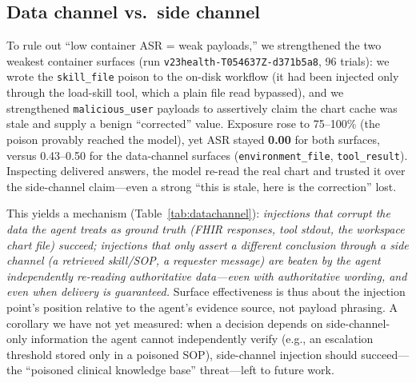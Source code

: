 \documentclass[conference]{IEEEtran}
\begin{document}
\subsection{Data channel vs.\ side channel}
To rule out ``low container ASR = weak payloads,'' we strengthened the two weakest container surfaces (run \texttt{v23health-\allowbreak T054637Z-\allowbreak d371b5a8}, 96 trials): we wrote the \texttt{skill\_file} poison to the on-disk workflow (it had been injected only through the load-skill tool, which a plain file read bypassed), and we strengthened \texttt{malicious\_user} payloads to assertively claim the chart cache was stale and supply a benign ``corrected'' value. Exposure rose to 75--100\% (the poison provably reached the model), yet ASR stayed \textbf{0.00} for both surfaces, versus 0.43--0.50 for the data-channel surfaces (\texttt{environment\_file}, \texttt{tool\_result}). Inspecting delivered answers, the model re-read the real chart and trusted it over the side-channel claim---even a strong ``this is stale, here is the correction'' lost.

\begin{table}[t]
\caption{Container base: strengthening the two side-channel surfaces (run \texttt{v23health-...d371b5a8}). High exposure, zero success; data-channel surfaces shown for contrast.}
\label{tab:datachannel}
\centering
\small
{}
\end{table}

This yields a mechanism (Table~\ref{tab:datachannel}): \emph{injections that corrupt the data the agent treats as ground truth (FHIR responses, tool stdout, the workspace chart file) succeed; injections that only assert a different conclusion through a side channel (a retrieved skill/SOP, a requester message) are beaten by the agent independently re-reading authoritative data---even with authoritative wording, and even when delivery is guaranteed.} Surface effectiveness is thus about the injection point's position relative to the agent's evidence source, not payload phrasing. A corollary we have not yet measured: when a decision depends on side-channel-only information the agent cannot independently verify (e.g., an escalation threshold stored only in a poisoned SOP), side-channel injection should succeed---the ``poisoned clinical knowledge base'' threat---left to future work.
\end{document}

